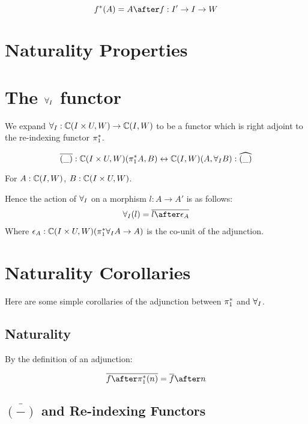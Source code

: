 \documentclass{report}
\begin{document}
\begin{equation}
    f\star(A) = A\after f: I'\rightarrow I\rightarrow W
\end{equation}

\section{Naturality Properties}

\section{The $\forall_I$ functor}
We expand $\forall_I: \mathbb{C}(I\times U, W) \rightarrow \mathbb{C}(I, W)$ to be a functor which is right adjoint to the re-indexing functor $\pi_1^*$.

\begin{equation}
    \bar{(\_)}: \ciuw(\pstar A, B) \leftrightarrow \ciw(A, \allI B) : \widehat{(\_)}
\end{equation}

For $A: \mathbb{C}(I, W)$, $B: \mathbb{C}(I\times U, W)$.

Hence the action of $\forall_I$ on a morphism $l : A\rightarrow A'$ is as follows:
\begin{eqnarray}
    \allI(l) = \bar{l\after\e_A}
\end{eqnarray}
Where $\epsilon_A: \mathbb{C}(I\times U, W)(\pi_1^*\forall_I A \rightarrow A)$ is the co-unit of the adjunction.

\section{Naturality Corollaries}
Here are some simple corollaries of the adjunction between $\pi_1^*$ and $\forall_I$.

\subsection{Naturality}
By the definition of an adjunction:

\begin{equation}
    \bar{f\after\pstar(n)} = \bar{f}\after n
\end{equation}

\subsection{$\bar{(-)}$ and Re-indexing Functors}
\end{document}
